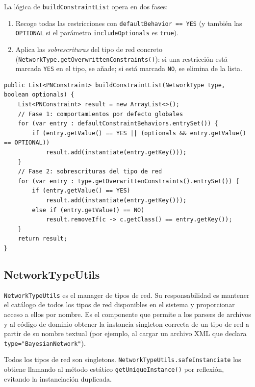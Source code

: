 \documentclass[12pt,a4paper,spanish]{article}
\begin{document}
La lógica de \texttt{buildConstraintList} opera en dos fases:
\begin{enumerate}
    \item Recoge todas las restricciones con \texttt{defaultBehavior == YES}
          (y también las \texttt{OPTIONAL} si el parámetro \texttt{includeOptionals}
          es \texttt{true}).
    \item Aplica las \emph{sobrescrituras} del tipo de red concreto
          (\texttt{NetworkType.getOverwrittenConstraints()}): si una restricción
          está marcada \texttt{YES} en el tipo, se añade; si está marcada
          \texttt{NO}, se elimina de la lista.
\end{enumerate}

\begin{lstlisting}[language=JavaPlugin,
    caption={Lógica simplificada de ConstraintManager.buildConstraintList}]
public List<PNConstraint> buildConstraintList(NetworkType type, boolean optionals) {
    List<PNConstraint> result = new ArrayList<>();
    // Fase 1: comportamientos por defecto globales
    for (var entry : defaultConstraintBehaviors.entrySet()) {
        if (entry.getValue() == YES || (optionals && entry.getValue() == OPTIONAL))
            result.add(instantiate(entry.getKey()));
    }
    // Fase 2: sobrescrituras del tipo de red
    for (var entry : type.getOverwrittenConstraints().entrySet()) {
        if (entry.getValue() == YES)
            result.add(instantiate(entry.getKey()));
        else if (entry.getValue() == NO)
            result.removeIf(c -> c.getClass() == entry.getKey());
    }
    return result;
}
\end{lstlisting}

\subsection{NetworkTypeUtils}
\label{sec:networktypeutils}

\texttt{NetworkTypeUtils} es el manager de tipos de red. Su responsabilidad es
mantener el catálogo de todos los tipos de red disponibles en el sistema y
proporcionar acceso a ellos por nombre. Es el componente que permite a los parsers
de archivos y al código de dominio obtener la instancia singleton correcta de un
tipo de red a partir de su nombre textual (por ejemplo, al cargar un archivo XML
que declara \texttt{type="BayesianNetwork"}).

Todos los tipos de red son singletons. \texttt{NetworkTypeUtils.safeInstanciate}
los obtiene llamando al método estático \texttt{getUniqueInstance()} por reflexión,
evitando la instanciación duplicada.
\end{document}
